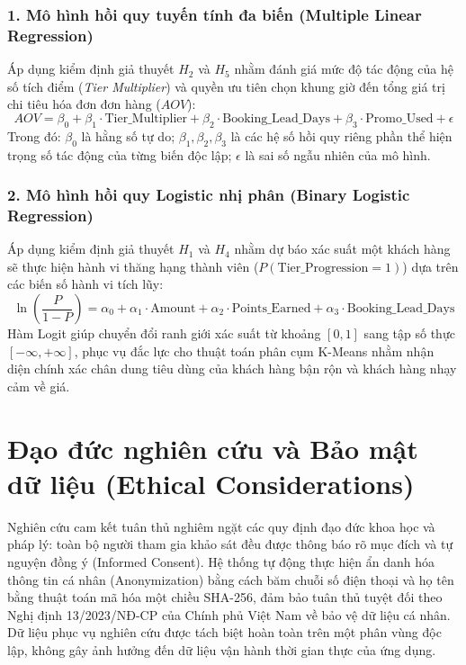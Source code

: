 \subsubsection{1. Mô hình hồi quy tuyến tính đa biến (Multiple Linear Regression)}
Áp dụng kiểm định giả thuyết $H_2$ và $H_5$ nhằm đánh giá mức độ tác động của hệ số tích điểm (\textit{Tier Multiplier}) và quyền ưu tiên chọn khung giờ đến tổng giá trị chi tiêu hóa đơn đơn hàng ($AOV$):
\begin{equation}
    AOV = \beta_0 + \beta_1 \cdot \text{Tier\_Multiplier} + \beta_2 \cdot \text{Booking\_Lead\_Days} + \beta_3 \cdot \text{Promo\_Used} + \epsilon
\end{equation}
Trong đó: $\beta_0$ là hằng số tự do; $\beta_1, \beta_2, \beta_3$ là các hệ số hồi quy riêng phần thể hiện trọng số tác động của từng biến độc lập; $\epsilon$ là sai số ngẫu nhiên của mô hình.

\subsubsection{2. Mô hình hồi quy Logistic nhị phân (Binary Logistic Regression)}
Áp dụng kiểm định giả thuyết $H_1$ và $H_4$ nhằm dự báo xác suất một khách hàng sẽ thực hiện hành vi thăng hạng thành viên ($P(\text{Tier\_Progression} = 1)$) dựa trên các biến số hành vi tích lũy:
\begin{equation}
    \ln\left(\frac{P}{1-P}\right) = \alpha_0 + \alpha_1 \cdot \text{Amount} + \alpha_2 \cdot \text{Points\_Earned} + \alpha_3 \cdot \text{Booking\_Lead\_Days}
\end{equation}
Hàm Logit giúp chuyển đổi ranh giới xác suất từ khoảng $[0,1]$ sang tập số thực $[-\infty, +\infty]$, phục vụ đắc lực cho thuật toán phân cụm K-Means nhằm nhận diện chính xác chân dung tiêu dùng của khách hàng bận rộn và khách hàng nhạy cảm về giá.

\section{Đạo đức nghiên cứu và Bảo mật dữ liệu (Ethical Considerations)}
Nghiên cứu cam kết tuân thủ nghiêm ngặt các quy định đạo đức khoa học và pháp lý: toàn bộ người tham gia khảo sát đều được thông báo rõ mục đích và tự nguyện đồng ý (Informed Consent). Hệ thống tự động thực hiện ẩn danh hóa thông tin cá nhân (Anonymization) bằng cách băm chuỗi số điện thoại và họ tên bằng thuật toán mã hóa một chiều SHA-256, đảm bảo tuân thủ tuyệt đối theo Nghị định 13/2023/NĐ-CP của Chính phủ Việt Nam về bảo vệ dữ liệu cá nhân. Dữ liệu phục vụ nghiên cứu được tách biệt hoàn toàn trên một phân vùng độc lập, không gây ảnh hưởng đến dữ liệu vận hành thời gian thực của ứng dụng.